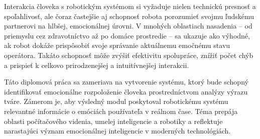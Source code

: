 Interakcia človeka s robotickým systémom si vyžaduje nielen technickú presnosť a spoľahlivosť, ale čoraz častejšie aj schopnosť robota porozumieť svojmu ľudskému partnerovi na hlbšej, emocionálnej úrovni. V mnohých oblastiach nasadenia – od priemyslu cez zdravotníctvo až po domáce prostredie – sa ukazuje ako výhodné, ak robot dokáže prispôsobiť svoje správanie aktuálnemu emočnému stavu operátora. Takáto schopnosť môže zvýšiť efektivitu spolupráce, znížiť počet chýb a prispieť k celkovo prirodzenejšej a intuitívnejšej interakcii.

Táto diplomová práca sa zameriava na vytvorenie systému, ktorý bude schopný identifikovať emocionálne rozpoloženie človeka prostredníctvom analýzy výrazu tváre. Zámerom je, aby výsledný modul poskytoval robotickému systému relevantné informácie o emóciách používateľa v reálnom čase. Téma prepája oblasti počítačového videnia, umelej inteligencie a robotiky a reflektuje narastajúci význam emocionálnej inteligencie v moderných technológiách.